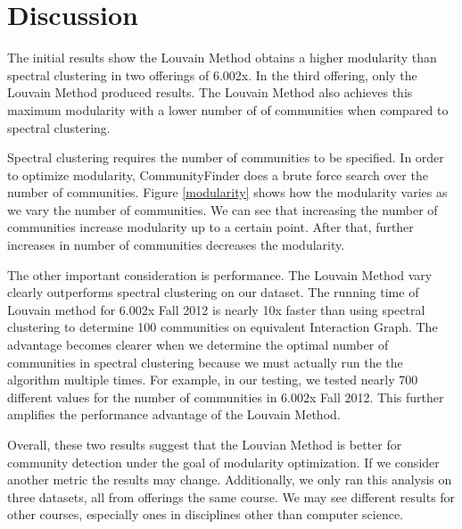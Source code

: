 \section{Discussion}
The initial results show the Louvain Method obtains a higher modularity than spectral clustering in two offerings of 6.002x. In the third offering, only the Louvain Method produced results. The Louvain Method also achieves this maximum modularity with a lower number of of communities when compared to spectral clustering.

Spectral clustering requires the number of communities to be specified. In order to optimize modularity, CommunityFinder does a brute force search over the number of communities. Figure \ref{modularity} shows how the modularity varies as we vary the number of communities. We can see that increasing the number of communities increase modularity up to a certain point. After that, further increases in number of communities decreases the modularity. 

The other important consideration is performance. The Louvain Method vary clearly outperforms spectral clustering on our dataset. The running time of Louvain method for 6.002x Fall 2012 is nearly 10x faster than using spectral clustering to determine 100 communities on equivalent Interaction Graph. The advantage becomes clearer when we determine the optimal number of communities in spectral clustering because we must actually run the the algorithm multiple times. For example, in our testing, we tested nearly 700 different values for the number of communities in 6.002x Fall 2012. This further amplifies the performance advantage of the Louvain Method.

Overall, these two results suggest that the Louvian Method is better for community detection under the goal of modularity optimization. If we consider another metric the results may change. Additionally, we only ran this analysis on three datasets, all from offerings the same course. We may see different results for other courses, especially ones in disciplines other than computer science.